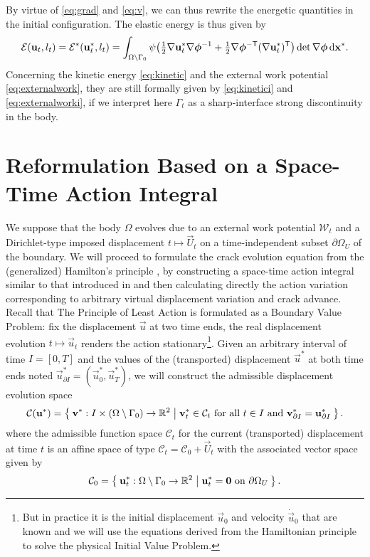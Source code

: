 By virtue of \eqref{eq:grad} and \eqref{eq:v}, we can thus rewrite the energetic quantities in the initial configuration. The elastic energy is thus given by
\begin{equation} \label{eq:elastici}
\mathcal{E}(\vec{u}_t,l_t)=\mathcal{E}^*(\vec{u}_t^*,l_t)=\int_\domaini\psi\bigl({\textstyle\frac{1}{2}}\nabla\vec{u}_t^*\nabla\philt^{-1}+{\textstyle\frac{1}{2}}\nabla\philt^{-\mathsf{T}}(\nabla\vec{u}_t^*)^\mT\bigr)\det\nabla\philt\dxx.
\end{equation}
Concerning the kinetic energy \eqref{eq:kinetic} and the external work potential \eqref{eq:externalwork}, they are still formally given by \eqref{eq:kinetici} and \eqref{eq:externalworki}, if we interpret here $\Gamma_t$ as a sharp-interface strong discontinuity in the body.

\section{Reformulation Based on a Space-Time Action Integral} \label{sec:reformulationtheta}
We suppose that the body $\Omega$ evolves due to an external work potential $\mathcal{W}_t$ and a Dirichlet-type imposed displacement $t\mapsto\vec{U}_t$ on a time-independent subset $\partial\Omega_U$ of the boundary. We will proceed to formulate the crack evolution equation from the (generalized) Hamilton's principle \cite{Hamilton:1834}, by constructing a space-time action integral similar to that introduced in \cite{Adda-BediaAriasAmarLund:1999} and then calculating directly the action variation corresponding to arbitrary virtual displacement variation and crack advance. Recall that The Principle of Least Action is formulated as a Boundary Value Problem: fix the displacement $\vec{u}$ at two time ends, the real displacement evolution $t\mapsto\vec{u}_t$ renders the action stationary\footnote{But in practice it is the initial displacement $\vec{u}_0$ and velocity $\dot{\vec{u}}_0$ that are known and we will use the equations derived from the Hamiltonian principle to solve the physical Initial Value Problem.}. Given an arbitrary interval of time $I=[0,T]$ and the values of the (transported) displacement $\vec{u}^*$ at both time ends noted $\vec{u}^*_{\partial I}=(\vec{u}^*_0,\vec{u}^*_T)$, we will construct the admissible displacement evolution space
\begin{equation} \label{eq:Cu}
\mathcal{C}(\vec{u}^*)=\set{\vec{v}^*:I\times(\domaini)\to\mathbb{R}^2|\vec{v}_t^*\in\mathcal{C}_t\text{ for all $t\in I$ and }\vec{v}^*_{\partial I}=\vec{u}^*_{\partial I}}.
\end{equation}
where the admissible function space $\mathcal{C}_t$ for the current (transported) displacement at time $t$ is an affine space of type $\mathcal{C}_t=\mathcal{C}_0+\vec{U}_t$ with the associated vector space given by
\[
\mathcal{C}_0=\set{\vec{u}^*_t:\domaini\to\mathbb{R}^2|\vec{u}^*_t=\vec{0}\text{ on }\partial\Omega_U}.
\]

